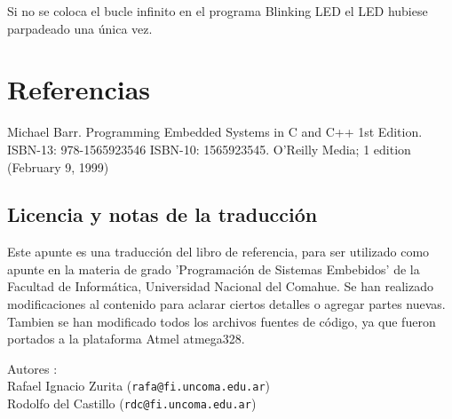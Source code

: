 \documentclass[12pt]{article}
\begin{document}
Si no se coloca el bucle infinito en el programa Blinking LED el LED hubiese
parpadeado una única vez.

\section*{Referencias}

Michael Barr. Programming Embedded Systems in C and C++ 1st Edition. ISBN-13: 978-1565923546
ISBN-10: 1565923545. O'Reilly Media; 1 edition (February 9, 1999)


\subsection*{Licencia y notas de la traducción}

Este apunte es una traducción del libro de referencia, para
ser utilizado como apunte en la materia de grado
'Programación de Sistemas Embebidos' de la Facultad de Informática,
Universidad Nacional del Comahue.
Se han realizado modificaciones
al contenido para aclarar ciertos detalles o agregar partes nuevas.
 Tambien se han
modificado todos los archivos fuentes de código, ya que fueron
portados a la plataforma Atmel atmega328.

Autores : \\
Rafael Ignacio Zurita ({\tt rafa@fi.uncoma.edu.ar}) \\
Rodolfo del Castillo ({\tt rdc@fi.uncoma.edu.ar})





\end{document}
